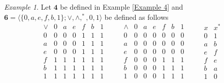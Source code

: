 \documentclass[12pt]{amsart}
\theoremstyle{definition}
\theoremstyle{remark}
\newtheorem{example}{Example}[section]
\numberwithin{equation}{section}
\begin{document}
\begin{example}\label{Example E} Let $\mathbf{4}$  be defined in Example \ref{Example 4} and  $\mathbf{6} = \langle \{0,a,e,f,b,1\} ; \vee ,\wedge ,^\ast, 0, 1 \rangle$ be defined as follows\\
$$
\begin{array}{c|cccccc} \vee & 0 & a & e & f & b & 1 \\ \hline
0 & 0 & 0 & 0 & 1 & 1 & 1 \\a & 0 & 0 & 0 & 1 & 1 & 1 \\e & 0 & 0 & 0 & 1 & 1 & 1 \\f & 1 & 1 & 1 & 1 & 1 & 1 \\b & 1 & 1 & 1 & 1 & 1 & 1 \\1 & 1 & 1 & 1 & 1 & 1 & 1
\end{array}
\qquad
\begin{array}{c|cccccc} \wedge & 0 & a & e & f & b & 1 \\ \hline
0 & 0 & 0 & 0 & 0 & 0 & 0 \\a & 0 & 0 & 0 & 0 & 0 & 0 \\e & 0 & 0 & 0 & 0 & 0 & 0 \\f & 0 & 0 & 0 & 1 & 1 & 1 \\b & 0 & 0 & 0 & 1 & 1 & 1 \\1 & 0 & 0 & 0 & 1 & 1 & 1
\end{array}
\qquad
\begin{array}{c|c} x & x^{*} \\ \hline
0 & 1 \\a & b \\e & f \\f & e \\b & a \\1 & 0
\end{array}
$$


\end{example}
\end{document}
